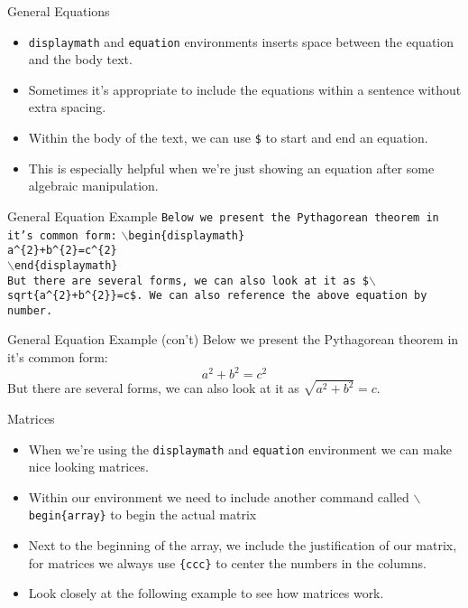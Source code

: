 \documentclass[pdf]{prosper}
\begin{document}
\begin{slide}{General Equations}
	\begin{itemize}
		\item \texttt{displaymath} and \texttt{equation} environments inserts space between the equation and the body text.
		\item Sometimes it's appropriate to include the equations within a sentence without extra spacing.
		\item Within the body of the text, we can use \texttt{\$} to start and end an equation.
		\item This is especially helpful when we're just showing an equation after some algebraic manipulation.
	\end{itemize}
\end{slide}
\begin{slide}{General Equation Example}
	\texttt{Below we present the Pythagorean theorem in it's common form:}
	\texttt{$\backslash$begin\{displaymath\}} \\
	\texttt{a\^{}\{2\}+b\^{}\{2\}=c\^{}\{2\}} \\
	\texttt{$\backslash$end\{displaymath\}} \\
	\texttt{But there are several forms, we can also look at it as \$$\backslash$sqrt\{a\^{}\{2\}+b\^{}\{2\}\}=c\$. We can also reference the above equation by number.}
\end{slide}
\begin{slide}{General Equation Example (con't)}
	Below we present the Pythagorean theorem in it's common form: \\
	\begin{displaymath}
	a^{2}+b^{2}=c^{2}
	\end{displaymath}
	But there are several forms, we can also look at it as $\sqrt{a^{2}+b^{2}}=c$.
\end{slide}
\begin{slide}{Matrices}
	\begin{itemize}
		\item When we're using the \texttt{displaymath} and \texttt{equation} environment we can make nice looking matrices.
		\item Within our environment we need to include another command called \texttt{$\backslash$begin\{array\}} to begin the actual matrix
		\item Next to the beginning of the array, we include the justification of our matrix, for matrices we always use \texttt{\{ccc\}} to center the numbers in the columns.
		\item Look closely at the following example to see how matrices work.
	\end{itemize}
\end{slide}
\end{document}
